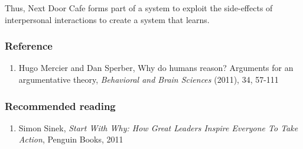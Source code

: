 Thus, Next Door Cafe forms part of a system to exploit the side-effects
of interpersonal interactions to create a system that learns.

\subsubsection{Reference}

\begin{enumerate}
\item
  Hugo Mercier and Dan Sperber, Why do humans reason? Arguments for an
  argumentative theory, \emph{Behavioral and Brain Sciences} (2011), 34,
  57-111
\end{enumerate}
\subsubsection{Recommended reading}

\begin{enumerate}
\item
  Simon Sinek, \emph{Start With Why: How Great Leaders Inspire Everyone
  To Take Action}, Penguin Books, 2011
\end{enumerate}
